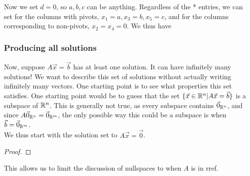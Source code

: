 Now we set $d=0$, so $a,b,c$ can be anything.
Regardless of the * entries, we can set for the columns with pivots, $x_1=a, x_3=b, x_5=c$, 
and for the columns corresponding to non-pivots, $x_2=x_4=0$. We thus have


\subsubsection*{Producing all solutions}
Now, suppose $A\vec{x}=\vec{b}$ has at least one solution. It can have infinitely many solutions! We want to describe this set of solutions without actually
writing infinitely many vectors. One starting point is to see what properties this set satisfies. One starting point 
would be to guess that the set $\{\vec{x}\in\mathbb{R}^n | A\vec{x}=\vec{b}\}$ is a subspace of $\mathbb{R}^n$.
This is generally not true, as every subspace contains $\vec{0}_{\mathbb{R}^n}$, and since $A\vec{0}_{\mathbb{R}^n}=\vec{0}_{\mathbb{R}^m}$,
the only possible way this could be a subspace is when $\vec{b}=\vec{0}_{\mathbb{R}^m}$.\\

We thus start with the solution set to $A\vec{x}=\vec{0}$.
\begin{proof}
	\todo
\end{proof}
This allows us to limit the discussion of nullspaces to when $A$ is in rref.

